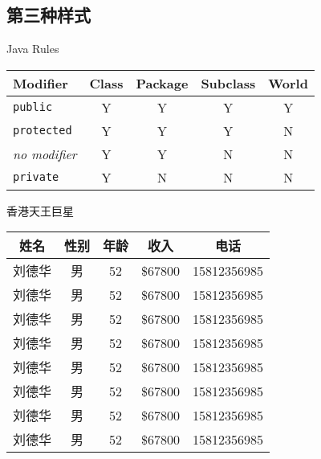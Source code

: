 \subsection{第三种样式}

\begin{Table}{Java Rules}
\begin{tabular}{l*{4}{c}}
	\toprule
	\bfseries Modifier   & \bfseries Class & \bfseries Package & \bfseries Subclass & \bfseries World \\
	\midrule
	\texttt{public}      & Y               & Y                 & Y                  & Y               \\
	\texttt{protected}   & Y               & Y                 & Y                  & N               \\
	\itshape no modifier & Y               & Y                 & N                  & N               \\
	\texttt{private}     & Y               & N                 & N                  & N               \\
	\bottomrule
\end{tabular}
\end{Table}

\begin{Table}{香港天王巨星}
\begin{tabular}{*{5}{c}}
	\toprule
	\bfseries 姓名  & \bfseries 性别 & \bfseries 年龄 & \bfseries 收入 & \bfseries 电话 \\
	\midrule
	{刘德华}        &{男}            &{52}            &{\${67800}}     &{15812356985}   \\
	{刘德华}        &{男}            &{52}            &{\${67800}}     &{15812356985}   \\
	{刘德华}        &{男}            &{52}            &{\${67800}}     &{15812356985}   \\
	{刘德华}        &{男}            &{52}            &{\${67800}}     &{15812356985}   \\
	{刘德华}        &{男}            &{52}            &{\${67800}}     &{15812356985}   \\
	{刘德华}        &{男}            &{52}            &{\${67800}}     &{15812356985}   \\
	{刘德华}        &{男}            &{52}            &{\${67800}}     &{15812356985}   \\
	{刘德华}        &{男}            &{52}            &{\${67800}}     &{15812356985}   \\
	\bottomrule
\end{tabular}
\end{Table}
